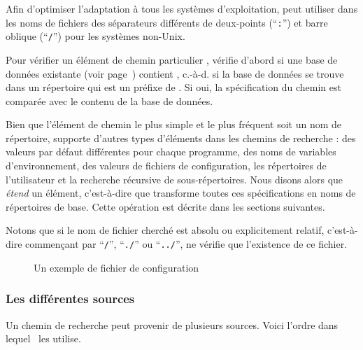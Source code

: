 \documentclass[german, english, french]{article}
\renewcommand{\samp}[1]{\enquote{\texttt{#1}}}
\begin{document}
Afin d'optimiser l'adaptation à tous les systèmes d'exploitation, \KPS{} peut
utiliser dans les noms de fichiers des séparateurs différents de deux-points
(\samp{:}) et barre oblique (\samp{/}) pour les systèmes non-Unix.

Pour vérifier un élément de chemin particulier , \KPS{} vérifie d'abord
si une base de données existante (voir page~\pageref{sec:filename-database})
contient , c.-à-d. si la base de données se trouve dans un répertoire qui
est un préfixe de . Si oui, la spécification du chemin est comparée avec
le contenu de la base de données.

Bien que l'élément de chemin le plus simple et le plus fréquent soit un nom de
répertoire, \KPS{} supporte d'autres types d'éléments dans les chemins de
recherche : des valeurs par défaut différentes pour chaque programme, des noms
de variables d'environnement, des valeurs de fichiers de configuration, les
répertoires de l'utilisateur et la recherche récursive de sous-répertoires. Nous
disons alors que \KPS{} \emph{étend} un élément, c'est-à-dire que \KPS{}
transforme toutes ces spécifications en noms de répertoires de base. Cette
opération est décrite dans les sections suivantes.

Notons que si le nom de fichier cherché est absolu ou explicitement relatif,
c'est-à-dire commençant par \samp{/}, \samp{./} ou \samp{../}, \KPS{} ne vérifie
que l'existence de ce fichier.  \ifSingleColumn \else
\begin{figure*}
  \centering  \setlength{\abovecaptionskip}{0pt}
  \caption{Un exemple de fichier de configuration}
  \label{fig:config-sample}
\end{figure*}
\fi

\subsubsection{Les différentes sources}
\label{sec:path-sources}

Un chemin de recherche peut provenir de plusieurs sources. Voici l'ordre dans
lequel \KPS\ les utilise.
\end{document}
